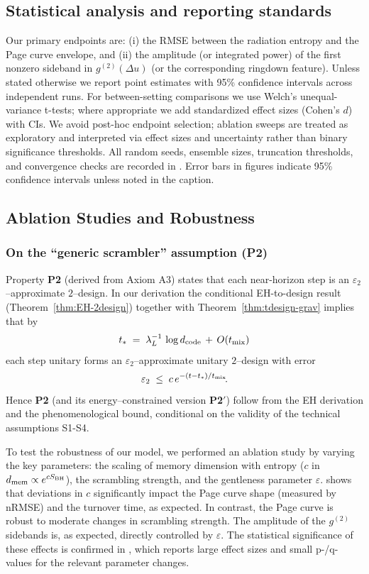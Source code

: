 \documentclass[11pt,a4paper]{article}
\newcommand{\Ptwo}{\textbf{P2}\xspace}
\newcommand{\PtwoPrime}{\textbf{P2$'$}\xspace}
\theoremstyle{plain}
\theoremstyle{definition}
\theoremstyle{remark}
\begin{document}
\subsection{Statistical analysis and reporting standards}

\label{ssec:stats}
Our primary endpoints are: (i) the RMSE between the radiation entropy and the Page curve envelope, and (ii) the amplitude (or integrated power) of the first nonzero sideband in $g^{(2)}(\Delta u)$ (or the corresponding ringdown feature). Unless stated otherwise we report point estimates with 95\% confidence intervals across independent runs. For between-setting comparisons we use Welch's unequal-variance t-tests; where appropriate we add standardized effect sizes (Cohen's $d$) with CIs. We avoid post-hoc endpoint selection; ablation sweeps are treated as exploratory and interpreted via effect sizes and uncertainty rather than binary significance thresholds. All random seeds, ensemble sizes, truncation thresholds, and convergence checks are recorded in . Error bars in figures indicate 95\% confidence intervals unless noted in the caption.

\subsection{Ablation Studies and Robustness}
\subsubsection{On the ``generic scrambler'' assumption (\Ptwo)}
Property \Ptwo{} (derived from Axiom A3) states that each near-horizon step is an $\varepsilon_2$--approximate $2$--design.
In our derivation the conditional EH-to-design result (Theorem~\ref{thm:EH-2design}) together with Theorem~\ref{thm:tdesign-grav} implies that by
\[
t_\ast \;=\; \lambda_L^{-1}\,\log d_{\rm code} \,+\, O(t_{\rm mix})
\]
each step unitary forms an $\varepsilon_2$--approximate unitary $2$--design with error
\[
\varepsilon_2 \;\le\; c\,e^{-(t-t_\ast)/t_{\rm mix}}\!.
\]
Hence \Ptwo{} (and its energy--constrained version \PtwoPrime) follow from the EH derivation and the phenomenological bound, conditional on the validity of the technical assumptions S1-S4.

To test the robustness of our model, we performed an ablation study by varying the key parameters: the scaling of memory dimension with entropy ($c$ in $d_{\rm mem} \propto e^{c S_{\rm BH}}$), the scrambling strength, and the gentleness parameter $\varepsilon$.  shows that deviations in $c$ significantly impact the Page curve shape (measured by nRMSE) and the turnover time, as expected. In contrast, the Page curve is robust to moderate changes in scrambling strength. The amplitude of the $g^{(2)}$ sidebands is, as expected, directly controlled by $\varepsilon$. The statistical significance of these effects is confirmed in , which reports large effect sizes and small p-/q-values for the relevant parameter changes.
\end{document}
